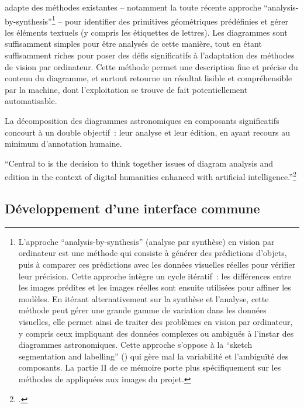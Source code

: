 \eida adapte des méthodes existantes -- notamment la toute récente
approche ``analysis-by-synthesis''\footnote{L'approche
  ``analysis-by-synthesis'' (analyse par synthèse) en vision par
  ordinateur est une méthode qui consiste à générer des prédictions
  d'objets, puis à comparer ces prédictions avec les données visuelles
  réelles pour vérifier leur précision. Cette approche intègre un cycle
  itératif~: les différences entre les images prédites et les images
  réelles sont ensuite utilisées pour affiner les modèles. En itérant
  alternativement sur la synthèse et l'analyse, cette méthode peut gérer
  une grande gamme de variation dans les données visuelles, elle permet
  ainsi de traiter des problèmes en vision par ordinateur, y compris
  ceux impliquant des données complexes ou ambiguës à l'instar des
  diagrammes astronomiques. Cette approche s'oppose à la ``sketch
  segmentation and labelling'' (\cite{ha_neural_2017}) qui gère mal la
  variabilité et l'ambiguïté des composants. La partie II de ce mémoire
  porte plus spécifiquement sur les méthodes de \cv
  appliquées aux images du projet.} -- pour identifier des primitives
géométriques prédéfinies et gérer les éléments textuels (y compris les
étiquettes de lettres). Les diagrammes sont suffisamment simples pour
être analysés de cette manière, tout en étant suffisamment riches pour
poser des défis significatifs à l'adaptation des méthodes de vision par
ordinateur. Cette méthode permet une description fine et précise du
contenu du diagramme, et surtout retourne un résultat lisible et
compréhensible par la machine, dont l'exploitation se trouve de fait
potentiellement automatisable.

La décomposition des diagrammes astronomiques en composants
significatifs concourt à un double objectif~: leur analyse et leur
édition, en ayant recours au minimum d'annotation humaine.

\begin{kwote}                     
``Central to \eida is the decision to think together issues of diagram
analysis and edition in the context of digital humanities enhanced with
artificial intelligence.''\footcite{husson_eida_2022}
\end{kwote}       

\hypertarget{developpement-dune-interface-commune}{%
\subsection{Développement d'une interface
commune}\label{developpement-dune-interface-commune}}

